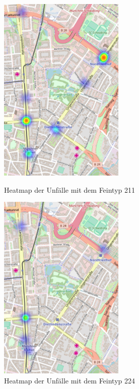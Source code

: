 \begin{figure}[htb]
	\centering
	\begin{minipage}[t]{0.45\linewidth}
		\centering
		\includegraphics[width=6cm,height=9cm]{figures/HM_211}
		\caption{Heatmap der Unfälle mit dem Feintyp 211}\label{fig:Heatmap_211}
	\end{minipage}%
	\hfill
	\begin{minipage}[t]{0.45\linewidth}
		\centering
		\includegraphics[width=6cm,height=9cm]{figures/HM_224}
		\caption{Heatmap der Unfälle mit dem Feintyp 224}\label{fig:Heatmap_224}
	\end{minipage}
\end{figure}

